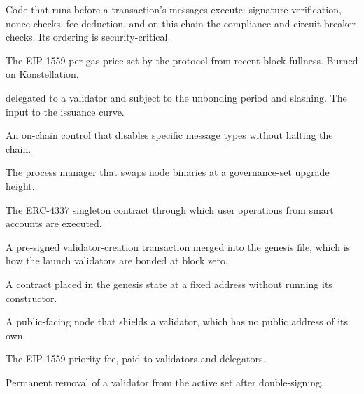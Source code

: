 \begin{description}[style=nextline]
\item[Ante handler] Code that runs before a transaction's messages execute:
  signature verification, nonce checks, fee deduction, and on this chain the
  compliance and circuit-breaker checks. Its ordering is security-critical.
\item[Base fee] The EIP-1559 per-gas price set by the protocol from recent
  block fullness. Burned on Konstellation.
\item[Bonded] \kash{} delegated to a validator and subject to the unbonding
  period and slashing. The input to the issuance curve.
\item[Circuit breaker] An on-chain control that disables specific message
  types without halting the chain.
\item[Cosmovisor] The process manager that swaps node binaries at a
  governance-set upgrade height.
\item[EntryPoint] The ERC-4337 singleton contract through which user
  operations from smart accounts are executed.
\item[Genesis transaction (gentx)] A pre-signed validator-creation transaction
  merged into the genesis file, which is how the launch validators are bonded
  at block zero.
\item[Preinstall] A contract placed in the genesis state at a fixed address
  without running its constructor.
\item[Sentry] A public-facing node that shields a validator, which has no
  public address of its own.
\item[Tip] The EIP-1559 priority fee, paid to validators and delegators.
\item[Tombstone] Permanent removal of a validator from the active set after
  double-signing.
\end{description}
